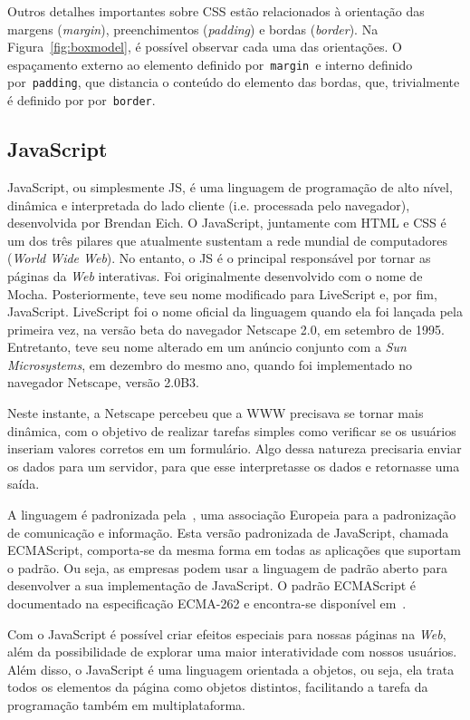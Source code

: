 Outros detalhes importantes sobre CSS estão relacionados à orientação das margens (\textit{margin}), preenchimentos (\textit{padding}) e bordas (\textit{border}). Na Figura~\ref{fig:boxmodel}, é possível observar cada uma das orientações. O espaçamento externo ao elemento definido por~\texttt{margin}~e interno definido por~\texttt{padding}, que distancia o conteúdo do elemento das bordas, que, trivialmente é definido por por~\texttt{border}.
%
%
%
\subsection{JavaScript}
\label{SubJS}

JavaScript, ou simplesmente JS, é uma linguagem de programação de alto nível, dinâmica e interpretada do lado cliente (i.e. processada pelo navegador), desenvolvida por Brendan Eich. O JavaScript, juntamente com HTML e CSS é um dos três pilares que atualmente sustentam a rede mundial de computadores (\textit{World Wide Web}). No entanto, o JS é o principal responsável por tornar as páginas da \textit{Web} interativas. Foi originalmente desenvolvido com o nome de Mocha. Posteriormente, teve seu nome modificado para LiveScript e, por fim, JavaScript. LiveScript foi o nome oficial da linguagem quando ela foi lançada pela primeira vez, na versão beta do navegador Netscape 2.0, em setembro de 1995. Entretanto, teve seu nome alterado em um anúncio conjunto com a \textit{Sun Microsystems}, em dezembro do mesmo ano, quando foi implementado no navegador Netscape, versão 2.0B3.

Neste instante, a Netscape percebeu que a WWW precisava se tornar mais dinâmica, com o objetivo de realizar tarefas simples como verificar se os usuários inseriam valores corretos em um formulário. Algo dessa natureza precisaria enviar os dados para um servidor, para que esse interpretasse os dados e retornasse uma saída.

A linguagem é padronizada pela~, uma associação Europeia para a padronização de comunicação e informação. Esta versão padronizada de JavaScript, chamada ECMAScript, comporta-se da mesma forma em todas as aplicações que suportam o padrão. Ou seja, as empresas podem usar a linguagem de padrão aberto para desenvolver a sua implementação de JavaScript. O padrão ECMAScript é documentado na especificação ECMA-262 e encontra-se disponível em~.

Com o JavaScript é possível criar efeitos especiais para nossas páginas na \textit{Web}, além da possibilidade de explorar uma maior interatividade com nossos usuários. Além disso, o JavaScript é uma linguagem orientada a objetos, ou seja, ela trata todos os elementos da página como objetos distintos, facilitando a tarefa da programação também em multiplataforma.

